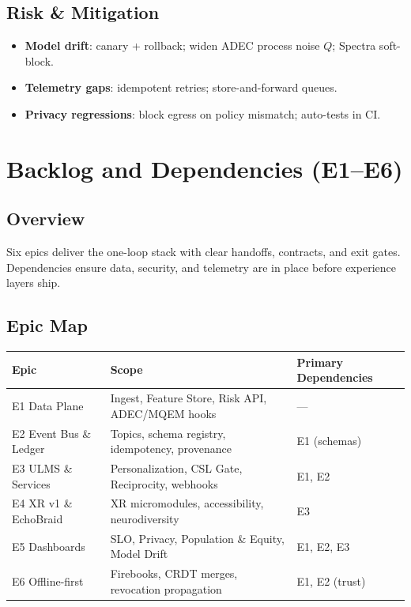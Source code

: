 \documentclass[11pt]{article}
\theoremstyle{plain}
\begin{document}
\subsection{Risk \& Mitigation}
\begin{itemize}
  \item \textbf{Model drift}: canary + rollback; widen ADEC process noise $Q$; Spectra soft-block.
  \item \textbf{Telemetry gaps}: idempotent retries; store-and-forward queues.
  \item \textbf{Privacy regressions}: block egress on policy mismatch; auto-tests in CI.
\end{itemize}

\section{Backlog and Dependencies (E1--E6)}

\subsection{Overview}
Six epics deliver the one-loop stack with clear handoffs, contracts, and exit gates. Dependencies ensure data, security, and telemetry are in place before experience layers ship.

\subsection{Epic Map}
\begin{center}
\begin{tabular}{l l l}
\hline
\textbf{Epic} & \textbf{Scope} & \textbf{Primary Dependencies} \\
\hline
E1 Data Plane & Ingest, Feature Store, Risk API, ADEC/MQEM hooks & --- \\
E2 Event Bus \& Ledger & Topics, schema registry, idempotency, provenance & E1 (schemas) \\
E3 ULMS \& Services & Personalization, CSL Gate, Reciprocity, webhooks & E1, E2 \\
E4 XR v1 \& EchoBraid & XR micromodules, accessibility, neurodiversity & E3 \\
E5 Dashboards & SLO, Privacy, Population \& Equity, Model Drift & E1, E2, E3 \\
E6 Offline-first & Firebooks, CRDT merges, revocation propagation & E1, E2 (trust) \\
\hline
\end{tabular}
\end{center}
\end{document}
